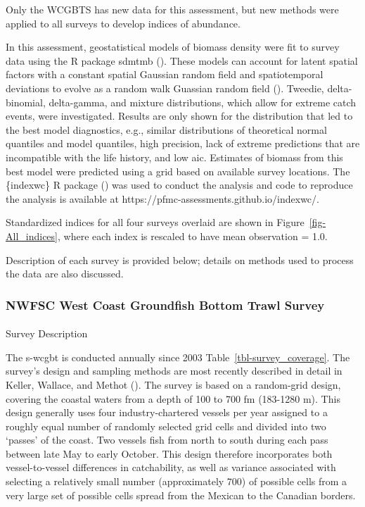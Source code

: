 \documentclass[
]{scrartcl}
\makeatletter
\let\oldparagraph\paragraph
\renewcommand{\paragraph}{
    \@ifstar
      \xxxParagraphStar
      \xxxParagraphNoStar
  }
\newcommand{\xxxParagraphStar}[1]{\oldparagraph*{#1}\mbox{}}
\newcommand{\xxxParagraphNoStar}[1]{\oldparagraph{#1}\mbox{}}
\makeatother
\begin{document}
Only the WCGBTS has new data for this assessment, but new methods were
applied to all surveys to develop indices of abundance.

In this assessment, geostatistical models of biomass density were fit to
survey data using the R package \gls{sdmtmb}
(). These models
can account for latent spatial factors with a constant spatial Gaussian
random field and spatiotemporal deviations to evolve as a random walk
Guassian random field (). Tweedie, delta-binomial, delta-gamma, and mixture
distributions, which allow for extreme catch events, were investigated.
Results are only shown for the distribution that led to the best model
diagnostics, e.g., similar distributions of theoretical normal quantiles
and model quantiles, high precision, lack of extreme predictions that
are incompatible with the life history, and low \gls{aic}. Estimates of
biomass from this best model were predicted using a grid based on
available survey locations. The \{indexwc\} R package
() was used to
conduct the analysis and code to reproduce the analysis is available at
https://pfmc-assessments.github.io/indexwc/.

Standardized indices for all four surveys overlaid are shown in
Figure~\ref{fig-All_indices}, where each index is rescaled to have mean
observation = 1.0.

Description of each survey is provided below; details on methods used to
process the data are also discussed.

\subsubsection{NWFSC West Coast Groundfish Bottom Trawl
Survey}\label{nwfsc-west-coast-groundfish-bottom-trawl-survey}

\paragraph{Survey Description}\label{survey-description}

The \gls{s-wcgbt} is conducted annually since 2003
Table~\ref{tbl-survey_coverage}. The survey's design and sampling
methods are most recently described in detail in Keller, Wallace, and
Methot (). The survey is based on a
random-grid design, covering the coastal waters from a depth of 100 to
700 fm (183-1280 m). This design generally uses four industry-chartered
vessels per year assigned to a roughly equal number of randomly selected
grid cells and divided into two `passes' of the coast. Two vessels fish
from north to south during each pass between late May to early October.
This design therefore incorporates both vessel-to-vessel differences in
catchability, as well as variance associated with selecting a relatively
small number (approximately 700) of possible cells from a very large set
of possible cells spread from the Mexican to the Canadian borders.
\end{document}

